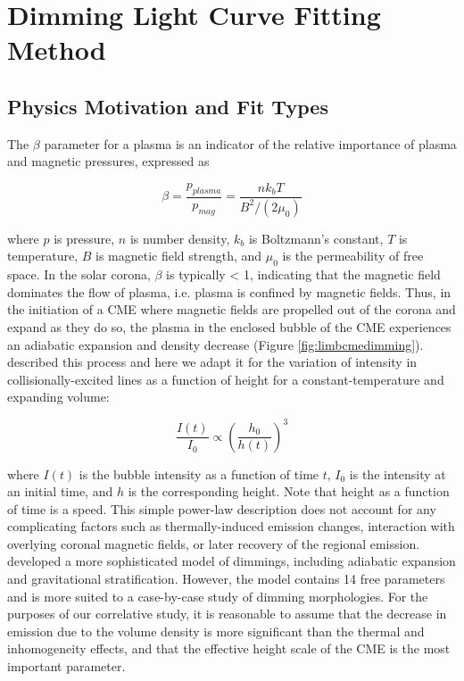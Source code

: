 \section{Dimming Light Curve Fitting Method}
\label{sec:fittingmethod}

\subsection{Physics Motivation and Fit Types}
The $\beta$ parameter for a plasma is an indicator of the relative importance of plasma and magnetic pressures, expressed as 

\begin{equation*}
    \beta = \frac{p_{plasma}}{p_{mag}} = \frac{nk_bT}{B^2/(2\mu _0)}
\end{equation*}

\noindent where $p$ is pressure, $n$ is number density, $k_b$ is Boltzmann's constant, $T$ is temperature, $B$ is magnetic field strength, and $\mu _0$ is the permeability of free space. In the solar corona, $\beta$ is typically < 1, indicating that the magnetic field dominates the flow of plasma, i.e. plasma is confined by magnetic fields. Thus, in the initiation of a CME where magnetic fields are propelled out of the corona and expand as they do so, the plasma in the enclosed bubble of the CME experiences an adiabatic expansion and density decrease (Figure \ref{fig:limbcmedimming}). \citet{Aschwanden2009a} described this process and here we adapt it for the variation of intensity in collisionally-excited lines as a function of height for a constant-temperature and expanding volume:

\begin{equation}
    \frac{I(t)}{I_0} \propto \left(\frac{h_0}{h(t)}\right)^3
    \label{eq:irradiancevsheight}
\end{equation}

where $I(t)$ is the bubble intensity as a function of time $t$, $I_0$ is the intensity at an initial time, and $h$ is the corresponding height. Note that height as a function of time is a speed. This simple power-law description does not account for any complicating factors such as thermally-induced emission changes, interaction with overlying coronal magnetic fields, or later recovery of the regional emission. \citet{Aschwanden2009b} developed a more sophisticated model of dimmings, including adiabatic expansion and gravitational stratification. However, the model contains 14 free parameters and is more suited to a case-by-case study of dimming morphologies. For the purposes of our correlative study, it is reasonable to assume that the decrease in emission due to the volume density is more significant than the thermal and inhomogeneity effects, and that the effective height scale of the CME is the most important parameter. 

